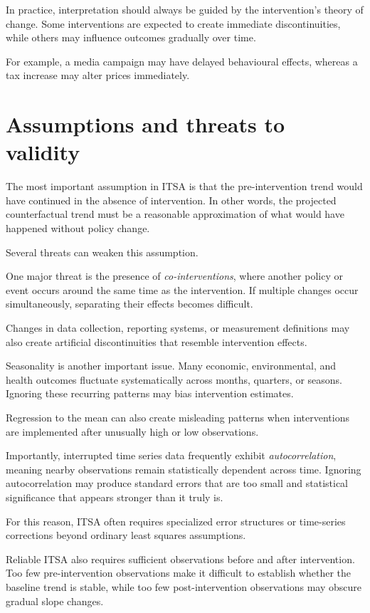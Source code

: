 \documentclass[
  11pt,
  oneside]{book}
\begin{document}
In practice, interpretation should always be guided by the intervention's theory of change. Some interventions are expected to create immediate discontinuities, while others may influence outcomes gradually over time.

For example, a media campaign may have delayed behavioural effects, whereas a tax increase may alter prices immediately.

\section{Assumptions and threats to validity}\label{assumptions-and-threats-to-validity}

The most important assumption in ITSA is that the pre-intervention trend would have continued in the absence of intervention. In other words, the projected counterfactual trend must be a reasonable approximation of what would have happened without policy change.

Several threats can weaken this assumption.

One major threat is the presence of \emph{co-interventions}, where another policy or event occurs around the same time as the intervention. If multiple changes occur simultaneously, separating their effects becomes difficult.

Changes in data collection, reporting systems, or measurement definitions may also create artificial discontinuities that resemble intervention effects.

Seasonality is another important issue. Many economic, environmental, and health outcomes fluctuate systematically across months, quarters, or seasons. Ignoring these recurring patterns may bias intervention estimates.

Regression to the mean can also create misleading patterns when interventions are implemented after unusually high or low observations.

Importantly, interrupted time series data frequently exhibit \emph{autocorrelation}, meaning nearby observations remain statistically dependent across time. Ignoring autocorrelation may produce standard errors that are too small and statistical significance that appears stronger than it truly is.

For this reason, ITSA often requires specialized error structures or time-series corrections beyond ordinary least squares assumptions.

Reliable ITSA also requires sufficient observations before and after intervention. Too few pre-intervention observations make it difficult to establish whether the baseline trend is stable, while too few post-intervention observations may obscure gradual slope changes.
\end{document}
